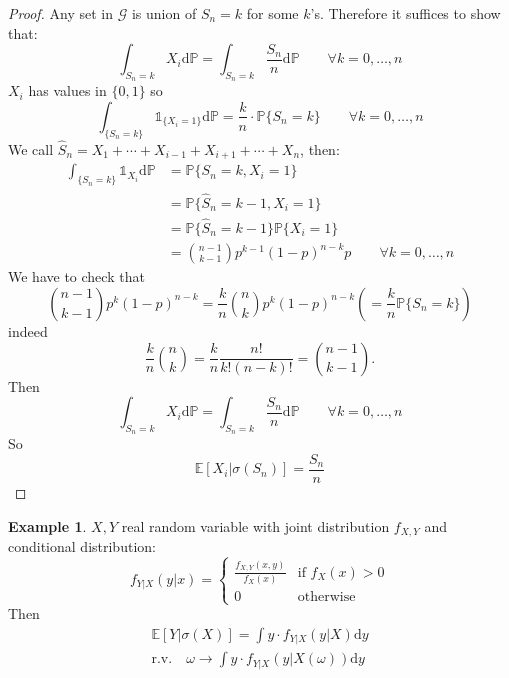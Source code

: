 \documentclass[10pt,a4paper]{article}
\theoremstyle{definition}
\newtheorem{exi}{Example}[section]
\newcommand{\ind}{\mathds{1}}
\begin{document}
\begin{proof}
Any set in $\mathcal{G}$ is union of $ {S_n=k} $ for some $ k $'s. Therefore it suffices to show that:
\begin{equation*}
	\int_{{S_n=k}}X_i\mathrm{d}\mathbb{P} = \int_{{S_n=k}}\frac{S_n}{n}\mathrm{d}\mathbb{P}  \qquad    \forall k=0,\ldots,n
\end{equation*}
$ X_i  $ has values in $ \{0,1\} $ so
\begin{equation*}
	\int_{\{S_n=k\}}\ind_{\{X_i=1\}}\mathrm{d}\mathbb{P} = \frac{k}{n}\cdot\mathbb{P}\{S_n=k\}   \qquad   \forall k=0,\ldots,n
\end{equation*}
We call $\hat{S}_n=X_1+\cdots+X_{i-1}+X_{i+1}+\cdots+X_n$, then:
\begin{equation*}
	\begin{split}
	\int_{\{S_n=k\}}\ind_{X_i}\mathrm{d}\mathbb{P} & = \mathbb{P}\{S_n=k,X_i=1\}\\
	&=\mathbb{P}\{\hat{S}_n=k-1,X_i=1\}\\
	&=\mathbb{P}\{\hat{S}_n=k-1\}\mathbb{P}\{X_i=1\}\\
	  & =\binom{n-1}{k-1}p^{k-1}(1-p)^{n-k}p 
	  \qquad\forall k=0,\ldots,n
   \end{split}
\end{equation*}
We have to check that
\begin{equation*}
	\binom{n-1}{k-1}p^{k}(1-p)^{n-k}=\frac{k}{n}\binom{n}{k}p^{k}(1-p)^{n-k}\left(=\frac{k}{n}\mathbb{P}\{S_n=k\}\right)
\end{equation*}
indeed
\begin{equation*}
	\frac{k}{n}\binom{n}{k}=\frac{k}{n}\frac{n!}{k!(n-k)!}=\binom{n-1}{k-1}.
\end{equation*}
Then
\begin{equation*}
	\int_{{S_n=k}}X_i\mathrm{d}\mathbb{P} = \int_{{S_n=k}}\frac{S_n}{n}\mathrm{d}\mathbb{P}  \qquad    \forall k=0,\ldots,n
\end{equation*}
So
\begin{equation*}
	\mathbb{E}[X_i|\sigma(S_n)]=\frac{S_n}{n}
\end{equation*}

\end{proof}
	\begin{exi}
		$ X,Y $ real random variable with joint distribution $ f_{X,Y} $ and conditional distribution:
		\begin{equation*}
			f_{Y|X}(y|x)=
			\begin{cases}
				\frac{f_{X,Y}(x,y)}{f_X(x)}   &\text{if } f_X(x)>0 \\
				0 & \text{otherwise}
			\end{cases}
		\end{equation*}
	Then
	\begin{equation*}
		\begin{split}
			\mathbb{E}[Y|\sigma(X)]=\int y \cdot f_{Y|X}(y|X)\mathrm{d}y \\
			\mathrm{r.v.} \quad \omega\to\int y\cdot f_{Y|X}(y|X(\omega))\mathrm{d}y
		\end{split}	
	\end{equation*}
	\end{exi}
\end{document}
